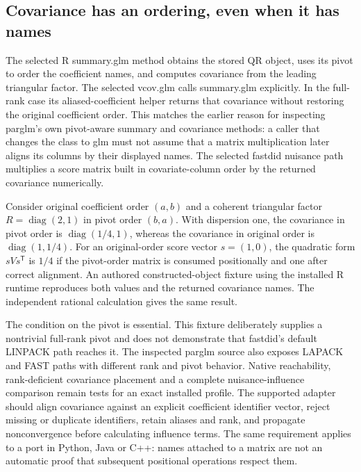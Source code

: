 \subsection{Covariance has an ordering, even when it has names}

The selected R summary.glm method obtains the stored QR object, uses its pivot to order the coefficient names, and computes covariance from the leading triangular factor. The selected vcov.glm calls summary.glm explicitly. In the full-rank case its aliased-coefficient helper returns that covariance without restoring the original coefficient order. This matches the earlier reason for inspecting parglm's own pivot-aware summary and covariance methods: a caller that changes the class to glm must not assume that a matrix multiplication later aligns its columns by their displayed names. The selected fastdid nuisance path multiplies a score matrix built in covariate-column order by the returned covariance numerically.~\citep{exec28_panel_estimator_sources,exec29_panel_inference_sources,exec29_panel_runtime_sources}

Consider original coefficient order $(a,b)$ and a coherent triangular factor $R=\operatorname{diag}(2,1)$ in pivot order $(b,a)$. With dispersion one, the covariance in pivot order is $\operatorname{diag}(1/4,1)$, whereas the covariance in original order is $\operatorname{diag}(1,1/4)$. For an original-order score vector $s=(1,0)$, the quadratic form $sVs^{\mathsf T}$ is $1/4$ if the pivot-order matrix is consumed positionally and one after correct alignment. An authored constructed-object fixture using the installed R runtime reproduces both values and the returned covariance names. The independent rational calculation gives the same result.~\citep{exec29_panel_runtime_reference}

The condition on the pivot is essential. This fixture deliberately supplies a nontrivial full-rank pivot and does not demonstrate that fastdid's default LINPACK path reaches it. The inspected parglm source also exposes LAPACK and FAST paths with different rank and pivot behavior. Native reachability, rank-deficient covariance placement and a complete nuisance-influence comparison remain tests for an exact installed profile. The supported adapter should align covariance against an explicit coefficient identifier vector, reject missing or duplicate identifiers, retain aliases and rank, and propagate nonconvergence before calculating influence terms. The same requirement applies to a port in Python, Java or C++: names attached to a matrix are not an automatic proof that subsequent positional operations respect them.~\citep{exec29_panel_inference_sources,exec29_panel_runtime_sources,exec29_panel_runtime_reference}

